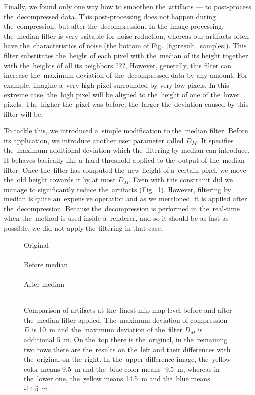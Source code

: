 Finally, we found only one way how to smoothen the~artifacts --- to post-process the~decompressed data. This post-processing does not happen during the~compression, but after the~decompression. In the~image processing, the~median filter is very suitable for noise reduction, whereas our artifacts often have the~characteristics of noise (the bottom of Fig.~\ref{fig:result_samples}). This filter substitutes the~height of each pixel with the~median of its height together with the~heights of all its neighbors ???, However, generally, this filter can increase the~maximum deviation of the~decompressed data by any amount. For example, imagine a~very high pixel surrounded by very low pixels. In this extreme case, the~high pixel will be aligned to the~height of one of the~lower pixels. The~higher the~pixel was before, the~larger the~deviation caused by this filter will be.

To tackle this, we introduced a~simple modification to the~median filter. Before its application, we introduce another user parameter called $D_M$. It specifies the~maximum additional deviation which the~filtering by median can introduce. It behaves basically like a~hard threshold applied to the~output of the~median filter. Once the~filter has computed the~new height of a~certain pixel, we move the~old height towards it by at most $D_M$. Even with this constraint did we manage to significantly reduce the~artifacts (Fig.~\ref{fig:artifs_median}). However, filtering by median is quite an~expensive operation and as we mentioned, it is applied after the~decompression. Because the~decompression is performed in the~real-time when the~method is used inside a~renderer, and so it should be as fast as possible, we did not apply the~filtering in that case.

\begin{figure}
	\begin{center}
		Original \\ 
		 \\ 
		Before median \\ 
		 
		 \\ 
		After median \\ 
		 
		 \\ 
	\end{center}
	\caption{Comparison of artifacts at the~finest mip-map level before and after the~median filter applied. The~maximum deviation of compression $D$ is 10~m and the~maximum deviation of the~filter $D_M$ is additional 5~m. On the~top there is the~original, in the~remaining two rows there are the~results on the~left and their differences with the~original on the~right. In the~upper difference image, the~yellow color means 9.5~m and the~blue color means -9.5~m, whereas in the~lower one, the~yellow means 14.5~m and the~blue means -14.5~m.}
	\label{fig:artifs_median}
\end{figure}
